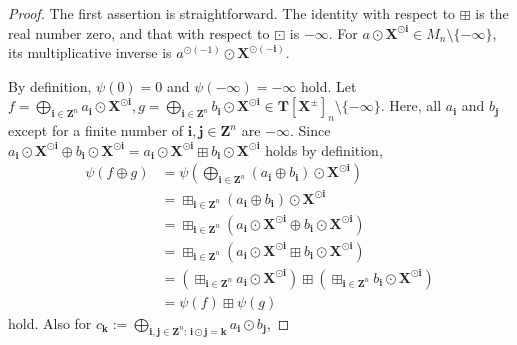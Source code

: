\documentclass[a4paper,12pt]{amsart}
\begin{document}
\begin{proof}
The first assertion is straightforward.
The identity with respect to $\boxplus$ is the real number zero, and that with respect to $\boxdot$ is $-\infty$.
For $a \odot \boldsymbol{X}^{\odot \boldsymbol{i}} \in M_n \setminus \{ -\infty \}$, its multiplicative inverse is $a^{\odot (-1)} \odot \boldsymbol{X}^{\odot (-\boldsymbol{i})}$.

By definition, $\psi(0) = 0$ and $\psi(-\infty) = -\infty$ hold.
Let $f = \bigoplus_{\boldsymbol{i} \in \boldsymbol{Z}^n} a_{\boldsymbol{i}} \odot \boldsymbol{X}^{\odot \boldsymbol{i}}, g = \bigoplus_{\boldsymbol{i} \in \boldsymbol{Z}^n} b_{\boldsymbol{i}} \odot \boldsymbol{X}^{\odot \boldsymbol{i}} \in \boldsymbol{T}[\boldsymbol{X}^{\pm}]_n \setminus \{ -\infty \}$.
Here, all $a_{\boldsymbol{i}}$ and $b_{\boldsymbol{j}}$ except for a finite number of $\boldsymbol{i}, \boldsymbol{j} \in \boldsymbol{Z}^n$ are $-\infty$.
Since $a_{\boldsymbol{i}} \odot \boldsymbol{X}^{\odot \boldsymbol{i}} \oplus b_{\boldsymbol{i}} \odot \boldsymbol{X}^{\odot \boldsymbol{i}} = a_{\boldsymbol{i}} \odot \boldsymbol{X}^{\odot \boldsymbol{i}} \boxplus b_{\boldsymbol{i}} \odot \boldsymbol{X}^{\odot \boldsymbol{i}}$ holds by definition, 
\begin{align*}
\psi(f \oplus g) &= \psi \left( \bigoplus_{\boldsymbol{i} \in \boldsymbol{Z}^n} (a_{\boldsymbol{i}} \oplus b_{\boldsymbol{i}}) \odot \boldsymbol{X}^{\odot \boldsymbol{i}} \right)\\
&
= \boxplus_{\boldsymbol{i} \in \boldsymbol{Z}^n} (a_{\boldsymbol{i}} \oplus b_{\boldsymbol{i}}) \odot \boldsymbol{X}^{\odot \boldsymbol{i}}\\
&= \boxplus_{\boldsymbol{i} \in \boldsymbol{Z}^n} (a_{\boldsymbol{i}} \odot \boldsymbol{X}^{\odot \boldsymbol{i}} \oplus b_{\boldsymbol{i}} \odot \boldsymbol{X}^{\odot \boldsymbol{i}})\\
&= \boxplus_{\boldsymbol{i} \in \boldsymbol{Z}^n} (a_{\boldsymbol{i}} \odot \boldsymbol{X}^{\odot \boldsymbol{i}} \boxplus b_{\boldsymbol{i}} \odot \boldsymbol{X}^{\odot \boldsymbol{i}})\\
&= \left( \boxplus_{\boldsymbol{i} \in \boldsymbol{Z}^n} a_{\boldsymbol{i}} \odot \boldsymbol{X}^{\odot \boldsymbol{i}} \right) \boxplus \left( \boxplus_{\boldsymbol{i} \in \boldsymbol{Z}^n} b_{\boldsymbol{i}} \odot \boldsymbol{X}^{\odot \boldsymbol{i}} \right)\\
&= \psi(f) \boxplus \psi(g)
\end{align*}
hold.
Also for $c_{\boldsymbol{k}} := \bigoplus_{\boldsymbol{i}, \boldsymbol{j} \in \boldsymbol{Z}^n :\, \boldsymbol{i} \odot \boldsymbol{j} = \boldsymbol{k}} a_{\boldsymbol{i}} \odot b_{\boldsymbol{j}}$,

\end{proof}
\end{document}
